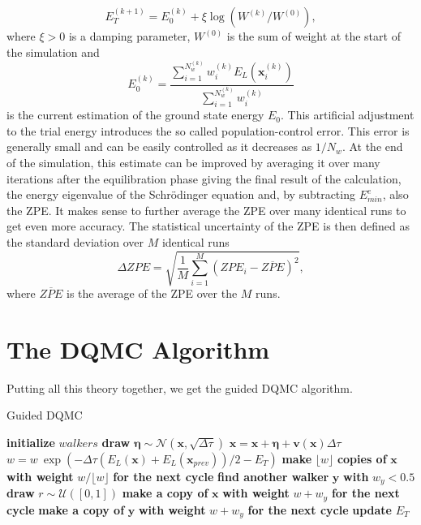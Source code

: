 \documentclass [12pt]{report}
\begin{document}
\begin{equation}\label{eq:2.12} 
E_T^{(k+1)} = E_0^{(k)} + \xi \log(W^{(k)}/W^{(0)}),
\end{equation}
where $\xi > 0$ is a damping parameter, $W^{(0)}$ is the sum of weight at the start of the simulation and
\begin{equation}\label{eq:2.13} 
E_0^{(k)} = \frac{\sum_{i = 1}^{N_w^{(k)}} w_{i}^{(k)} E_L(\bm{x}_{i}^{(k)})}{\sum_{i = 1}^{N_w^{(k)}} w_{i}^{(k)} }
\end{equation}
is the current estimation of the ground state energy $E_0$. This artificial adjustment to the trial energy introduces the so called population-control error. This error is generally small and can be easily controlled as it decreases as $1/N_{w}$. At the end of the simulation, this estimate can be improved by averaging it over many iterations after the equilibration phase giving the final result of the calculation, the energy eigenvalue of the Schrödinger equation and, by subtracting $E^e_{min}$, also the ZPE. It makes sense to further average the ZPE over many identical runs to get even more accuracy. The statistical uncertainty of the ZPE is then defined as the standard deviation over $M$ identical runs \cite{herleitung2}
\begin{equation}
\Delta ZPE = \sqrt{\frac{1}{M} \sum_{i=1}^M(ZPE_i - \overline{ZPE})^2},
\end{equation}
where $\overline{ZPE}$ is the average of the ZPE over the $M$ runs.
\section{The DQMC Algorithm}
Putting all this theory together, we get the guided DQMC algorithm.
\begin{algorithm}[H]
\caption{Guided DQMC}\label{dqmc}
\begin{algorithmic}[1]
\State \textbf{initialize} $walkers$
		\State \textbf{draw} $\bm{\eta} \sim \mathcal{N}(\bm{x},\sqrt{\Delta \tau})$
		\State $\bm{x} = \bm{x} + \bm{\eta} +  \bm{v}(\bm{x})\Delta \tau$ 
		\State $w = w \: \exp{(-\Delta \tau (E_L(\bm{x})+E_L(\bm{x}_{prev}))/2 - E_T)}$
		\State \textbf{make} $\lfloor w \rfloor$ \textbf{copies of} $\bm{x}$ \textbf{with weight} $w/\lfloor w \rfloor$ \textbf{for the next cycle}
		\EndIf
		\State \textbf{find another walker} $\bm{y}$ \textbf{with} $w_y < 0.5$
		\State \textbf{draw} $r \sim \mathcal{U}([0,1])$
		\State \textbf{make a copy of} $\bm{x}$ \textbf{with weight} $w+w_y$ \textbf{for the next cycle}
		\Else
		\State \textbf{make a copy of} $\bm{y}$ \textbf{with weight} $w+w_y$ \textbf{for the next cycle}
		\EndIf
		\EndIf 
	\EndFor
	\State \textbf{update} $E_T$ 
\EndFor 
\EndProcedure
\end{algorithmic}
\end{algorithm}
\newpage
\end{document}
